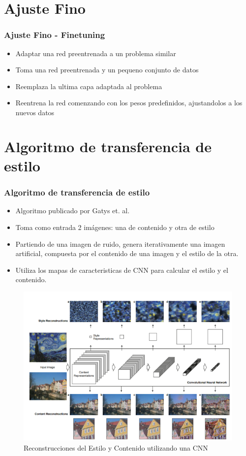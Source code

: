 \documentclass[12pt,center]{beamer}
\begin{document}
\section{Ajuste Fino}
\begin{frame}
  \frametitle{Ajuste Fino - Finetuning}
    \begin{itemize}
     \item Adaptar una red preentrenada a un problema similar
     \item Toma una red preentrenada y un pequeno conjunto de datos
     \item Reemplaza la ultima capa adaptada al problema
     \item Reentrena la red comenzando con los pesos predefinidos, ajustandolos a los nuevos datos
    \end{itemize}
\end{frame}


\section{Algoritmo de transferencia de estilo}
\begin{frame}
 \frametitle{Algoritmo de transferencia de estilo}
 \begin{itemize}
    \item Algoritmo publicado por Gatys et. al.
    \item Toma como entrada 2 imágenes: una de contenido y otra de estilo
    \item Partiendo de una imagen de ruido, genera iterativamente una imagen artificial, compuesta por el contenido de una imagen y el estilo de la otra.
    \item Utiliza los mapas de caracteristicas de CNN para calcular el estilo y el contenido.
 \end{itemize}
  \begin{figure}[h]
    \includegraphics[width=\textwidth]{./img/gatys_1.png}
    \caption{Reconstrucciones del Estilo y Contenido utilizando una CNN}
  \end{figure} 
\end{frame}
\end{document}
